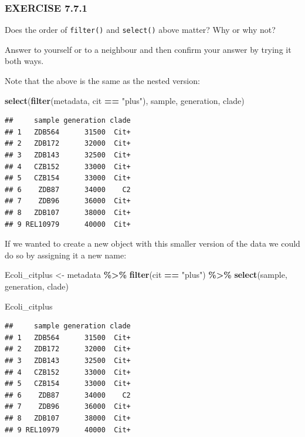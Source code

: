 \documentclass[
]{book}
\newenvironment{Shaded}{\begin{snugshade}}{\end{snugshade}}
\newcommand{\FunctionTok}[1]{\textcolor[rgb]{0.13,0.29,0.53}{\textbf{#1}}}
\newcommand{\NormalTok}[1]{#1}
\newcommand{\OtherTok}[1]{\textcolor[rgb]{0.56,0.35,0.01}{#1}}
\newcommand{\SpecialCharTok}[1]{\textcolor[rgb]{0.81,0.36,0.00}{\textbf{#1}}}
\newcommand{\StringTok}[1]{\textcolor[rgb]{0.31,0.60,0.02}{#1}}
\begin{document}
\subsubsection*{EXERCISE 7.7.1}\label{exercise-7.7.1}

Does the order of \texttt{filter()} and \texttt{select()} above matter? Why or why not?

Answer to yourself or to a neighbour and then confirm your answer by trying it both ways.

Note that the above is the same as the nested version:

\begin{Shaded}
\begin{Highlighting}[]
\FunctionTok{select}\NormalTok{(}\FunctionTok{filter}\NormalTok{(metadata, cit }\SpecialCharTok{==} \StringTok{"plus"}\NormalTok{), sample, generation, clade)}
\end{Highlighting}
\end{Shaded}

\begin{verbatim}
##     sample generation clade
## 1   ZDB564      31500  Cit+
## 2   ZDB172      32000  Cit+
## 3   ZDB143      32500  Cit+
## 4   CZB152      33000  Cit+
## 5   CZB154      33000  Cit+
## 6    ZDB87      34000    C2
## 7    ZDB96      36000  Cit+
## 8   ZDB107      38000  Cit+
## 9 REL10979      40000  Cit+
\end{verbatim}

If we wanted to create a new object with this smaller version of the data we could do so by assigning it a new name:

\begin{Shaded}
\begin{Highlighting}[]
\NormalTok{Ecoli\_citplus }\OtherTok{\textless{}{-}}\NormalTok{ metadata }\SpecialCharTok{\%\textgreater{}\%}
  \FunctionTok{filter}\NormalTok{(cit }\SpecialCharTok{==} \StringTok{"plus"}\NormalTok{) }\SpecialCharTok{\%\textgreater{}\%}
  \FunctionTok{select}\NormalTok{(sample, generation, clade)}

\NormalTok{Ecoli\_citplus}
\end{Highlighting}
\end{Shaded}

\begin{verbatim}
##     sample generation clade
## 1   ZDB564      31500  Cit+
## 2   ZDB172      32000  Cit+
## 3   ZDB143      32500  Cit+
## 4   CZB152      33000  Cit+
## 5   CZB154      33000  Cit+
## 6    ZDB87      34000    C2
## 7    ZDB96      36000  Cit+
## 8   ZDB107      38000  Cit+
## 9 REL10979      40000  Cit+
\end{verbatim}
\end{document}
